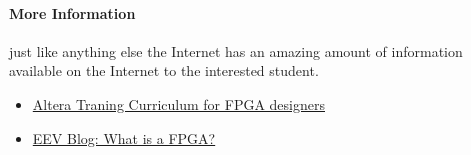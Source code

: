 \documentclass[12pt,journal]{IEEEtran}
\begin{document}
    \paragraph{More Information} just like anything else the Internet has an amazing amount of information available
    on the Internet to the interested student. 
      \begin{itemize}
        \item \href{http://www.altera.com/education/training/curriculum/fpga/trn-fpga.html}{Altera Traning Curriculum for FPGA designers}
        \item \href{www.eevblog.com}{EEV Blog: What is a FPGA?}
      \end{itemize}

  
  
\end{document}
